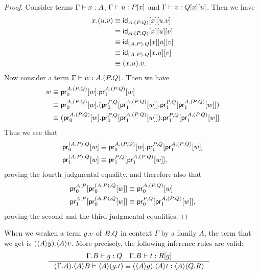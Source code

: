 \begin{proof}
Consider terms $\jterm{\Gamma}{A}{x}$, $\jterm{\Gamma}{\subst{x}{P}}{u}$ and
$\jterm{\Gamma}{\subst{u}{{x}{Q}}}{v}$. Then we have
\begin{align*}
\ctxext{x}{{u}{v}} & \jdeq \subst{\ctxext{u}{v}}{{x}{\idfunc[\ctxext{A}{{P}{Q}}]}}\\
& \jdeq \subst{v}{{u}{{x}{\idfunc[\ctxext{A}{{P}{Q}}]}}}\\
& \jdeq \subst{v}{{u}{{x}{\idfunc[\ctxext{{A}{P}}{Q}]}}}\\
& \jdeq \subst{v}{{\ctxext{x}{u}}{\idfunc[\ctxext{{A}{P}}{Q}]}}\\
& \jdeq \ctxext{{x}{u}}{v}.
\end{align*}
Now consider a term $\jterm{\Gamma}{\ctxext{A}{{P}{Q}}}{w}$. Then we have
\begin{align*}
w 
& \jdeq \ctxext{\cprojfst{A}{\ctxext{P}{Q}}{w}}{\cprojsnd{A}{\ctxext{P}{Q}}{w}}\\
& \jdeq \ctxext{\cprojfst{A}{\ctxext{P}{Q}}{w}}{{\cprojfst{P}{Q}{\cprojsnd{A}{\ctxext{P}{Q}}{w}}}{\cprojsnd{P}{Q}{\cprojsnd{A}{\ctxext{P}{Q}}{w}}}}\\
& \jdeq \ctxext{{\cprojfst{A}{\ctxext{P}{Q}}{w}}{\cprojfst{P}{Q}{\cprojsnd{A}{\ctxext{P}{Q}}{w}}}}{\cprojsnd{P}{Q}{\cprojsnd{A}{\ctxext{P}{Q}}{w}}}
\end{align*}
Thus we see that 
\begin{align*}
\cprojfst{\ctxext{A}{P}}{Q}{w} & \jdeq \ctxext{\cprojfst{A}{\ctxext{P}{Q}}{w}}{\cprojfst{P}{Q}{\cprojsnd{A}{\ctxext{P}{Q}}{w}}}\\ 
\cprojsnd{\ctxext{A}{P}}{Q}{w} & \jdeq \cprojsnd{P}{Q}{\cprojsnd{A}{\ctxext{P}{Q}}{w}},
\end{align*}
proving the fourth judgmental equality, and therefore also that
\begin{align*}
\cprojfst{A}{P}{\cprojfst{\ctxext{A}{P}}{Q}{w}} & \jdeq \cprojfst{A}{\ctxext{P}{Q}}{w}\\
\cprojsnd{A}{P}{\cprojfst{\ctxext{A}{P}}{Q}{w}} & \jdeq \cprojfst{P}{Q}{\cprojsnd{A}{\ctxext{P}{Q}}{w}},
\end{align*}
proving the second and the third judgmental equalities.
\end{proof}

\begin{lem}
When we weaken a term $\ctxext{y}{v}$ of $\ctxext{B}{Q}$ in context $\Gamma$ by
a family $A$, the term that we get is $\ctxext{\ctxwk{A}{y}}{\ctxwk{A}{v}}$. More
precisely, the following inference rules are valid:
\begin{align*}
& \inference{\jterm{{\Gamma}{B}}{Q}{g}\quad\jterm{{\Gamma}{B}}{\subst{g}{R}}{t}}{\jtermeq{{{\Gamma}{A}}{\ctxwk{A}{B}}}{\ctxwk{A}{\ctxext{Q}{R}}}{\ctxwk{A}{\ctxext{g}{t}}}{\ctxext{\ctxwk{A}{g}}{\ctxwk{A}{t}}}}
\end{align*}
\end{lem}

